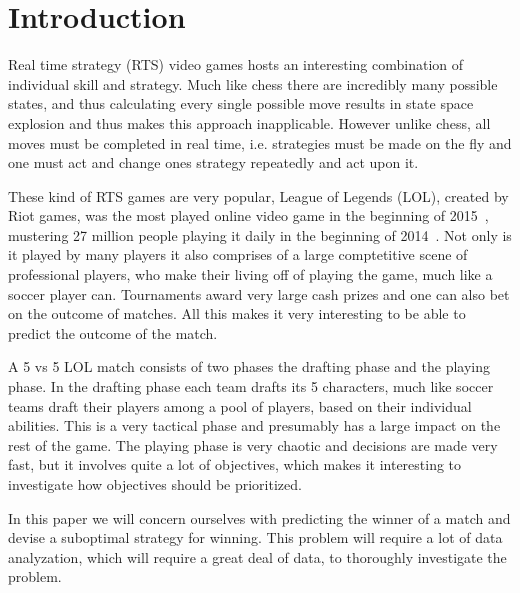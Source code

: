 \section{Introduction}\label{sec:intro}

Real time strategy (RTS) video games hosts an interesting combination of individual skill and strategy. Much like chess there are incredibly many possible states, and thus calculating every single possible move results in state space explosion and thus makes this approach inapplicable. However unlike chess, all moves must be completed in real time, i.e. strategies must be made on the fly and one must act and change ones strategy repeatedly and act upon it. 

These kind of RTS games are very popular, League of Legends (LOL), created by Riot games, was the most played online video game in the beginning of 2015~\cite{LoLmostplayed}, mustering 27 million people playing it daily in the beginning of 2014~\cite{LoL27mill}. Not only is it played by many players it also comprises of a large comptetitive scene of professional players, who make their living off of playing the game, much like a soccer player can. Tournaments award very large cash prizes and one can also bet on the outcome of matches. 
All this makes it very interesting to be able to predict the outcome of the match.

A 5 vs 5 LOL match consists of two phases the drafting phase and the playing phase. In the drafting phase each team drafts its 5 characters, much like soccer teams draft their players among a pool of players, based on their individual abilities. This is a very tactical phase and presumably has a large impact on the rest of the game. The playing phase is very chaotic and decisions are made very fast, but it involves quite a lot of objectives, which makes it interesting to investigate how objectives should be prioritized.

In this paper we will concern ourselves with predicting the winner of a match and devise a suboptimal strategy for winning. This problem will require a lot of data analyzation, which will require a great deal of data, to thoroughly investigate the problem.




